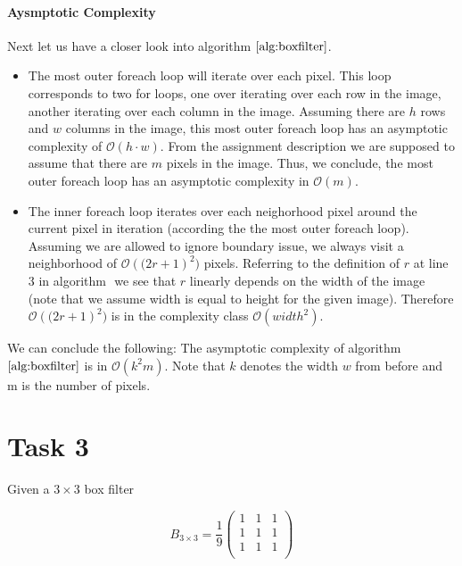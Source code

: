 \documentclass{paper}
\begin{document}
\paragraph{Aysmptotic Complexity} Next let us have a closer look into algorithm $\ref{alg:boxfilter}$.
\begin{itemize}
    \item The most outer foreach loop will iterate over each pixel. This loop corresponds to two for loops, one over iterating over each row in the image, another iterating over each column in the image. Assuming there are $h$ rows and $w$ columns in the image, this most outer foreach loop has an asymptotic complexity of $\mathcal{O}(h \cdot w)$. From the assignment description we are supposed to assume that there are $m$ pixels in the image. Thus, we conclude, the most outer foreach loop has an asymptotic complexity in $\mathcal{O}(m)$.
    \item The inner foreach loop iterates over each neighorhood pixel around the current pixel in iteration (according the the most outer foreach loop). Assuming we are allowed to ignore boundary issue, we always visit a neighborhood of $\mathcal{O}\left((2r+1\right)^2)$ pixels. Referring to the definition of $r$ at line 3 in algorithm $\label{alg:boxfilter}$ we see that $r$ linearly depends on the width of the image (note that we assume width is equal to height for the given image). Therefore $\mathcal{O}\left((2r+1\right)^2)$ is in the complexity class $\mathcal{O}\left(width^2\right)$. 
\end{itemize}

We can conclude the following: The asymptotic complexity of algorithm $\ref{alg:boxfilter}$ is in $\mathcal{O}\left(k^2 m \right)$. Note that $k$ denotes the width $w$ from before and m is the number of pixels.



\section*{Task 3}
Given a $3 \times 3$ box filter

\begin{equation}
B_{3 \times 3} = 
\frac{1}{9}
\begin{pmatrix}
1 & 1 & 1 \\
1 & 1 & 1 \\
1 & 1 & 1 \\
\end{pmatrix}
\label{eq:box_filter_3x3}
\end{equation}
\end{document}
